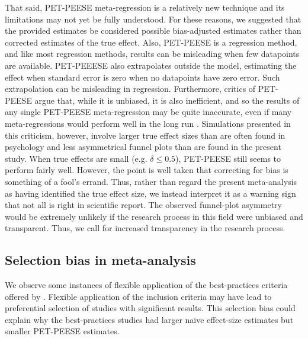 \documentclass[man]{apa6}
\begin{document}
That said, PET-PEESE meta-regression is a relatively new technique and its limitations may not yet be fully understood. For these reasons, we suggested that the provided estimates be considered possible bias-adjusted estimates rather than corrected estimates of the true effect. Also, PET-PEESE is a regression method, and like most regression methods, results can be misleading when few datapoints are available. PET-PEEESE also extrapolates outside the model, estimating the effect when standard error is zero when no datapoints have zero error. Such extrapolation can be misleading in regression. 
Furthermore, critics of PET-PEESE argue that, while it is unbiased, it is also inefficient, and so the results of any single PET-PEESE meta-regression may be quite inaccurate, even if many meta-regressions would perform well in the long run \citep{Reed:etal:WORKINGPAPER}. Simulations presented in this criticism, however, involve larger true effect sizes than are often found in psychology and less asymmetrical funnel plots than are found in the present study. When true effects are small (e.g. $\delta \le 0.5$), PET-PEESE still seems to perform fairly well. However, the point is well taken that correcting for bias is something of a fool's errand.
Thus, rather than regard the present meta-analysis as having identified the true effect size, we instead interpret it as a warning sign that not all is right in scientific report. The observed funnel-plot asymmetry would be extremely unlikely if the research process in this field were unbiased and transparent. Thus, we call for increased transparency in the research process. 

\subsection{Selection bias in meta-analysis} 
We observe some instances of flexible application of the best-practices criteria offered by \citet{Anderson:etal:2010}. Flexible application of the inclusion criteria may have lead to preferential selection of studies with significant results. This selection bias could explain why the best-practices studies had larger naive effect-size estimates but smaller PET-PEESE estimates.
\end{document}
